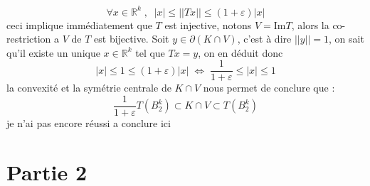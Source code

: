\documentclass{report}
\begin{document}
\begin{enumerate}[leftmargin=\labelsep]
	\begin{equation*}
	\forall x \in \mathbb{R}^k \; , \;\; |x|\leq ||Tx||\leq (1+\varepsilon)|x|
	\end{equation*}
	ceci implique immédiatement que $T$ est injective, notons $V=\text{Im}T$, alors la co-restriction a $V$ de $T$ est bijective.
	Soit $y\in \partial(K\cap V)$, c'est à dire $||y||=1$, on sait qu'il existe un unique $x\in\mathbb{R}^k$ tel que $Tx=y$, on en déduit donc 
	\begin{equation*}
	|x|\leq 1 \leq (1+\varepsilon)|x|\; \iff\; \frac{1}{1+\varepsilon}\leq|x|\leq 1
	\end{equation*}
	la convexité et la symétrie centrale de $K\cap V$ nous permet de conclure que  :
	\begin{equation}
		\frac{1}{1+\varepsilon}T(B_2^k)\subset K\cap V \subset T(B_2^k)
	\end{equation}
	\color{blue} je n'ai pas encore réussi a conclure ici\color{black}
\end{enumerate}
\newpage
\chapter*{Partie 2}
\end{document}
